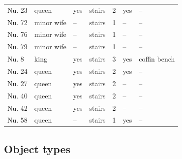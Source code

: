 {\begin{xltabular}{\textwidth}{X X X X X X X}
		\cmidrule(r){1-7}
		Nu. 23 & queen & yes & stairs & 2 & yes & -- \\
		\cmidrule(r){1-7}
		Nu. 72 & minor wife & -- & stairs & 1 & -- & -- \\
		\cmidrule(r){1-7}
		Nu. 76 & minor wife & -- & stairs & 1 & -- & -- \\
		\cmidrule(r){1-7}
		Nu. 79 & minor wife & -- & stairs & 1 & -- & -- \\
		\cmidrule(r){1-7}
		Nu. 8 & king & yes & stairs & 3 & yes & coffin bench \\
		\cmidrule(r){1-7}
		Nu. 24 & queen & yes & stairs & 2 & yes & -- \\
		\cmidrule(r){1-7}
		Nu. 27 & queen & yes & stairs & 2 & -- & -- \\
		\cmidrule(r){1-7}
		Nu. 40 & queen & yes & stairs & 2 & -- & -- \\
		\cmidrule(r){1-7}
		Nu. 42 & queen & yes & stairs & 2 & -- & -- \\
		\cmidrule(r){1-7}
		Nu. 58 & queen & -- & stairs & 1 & yes & -- \\
	\end{xltabular}
}


\subsection{Object types}


